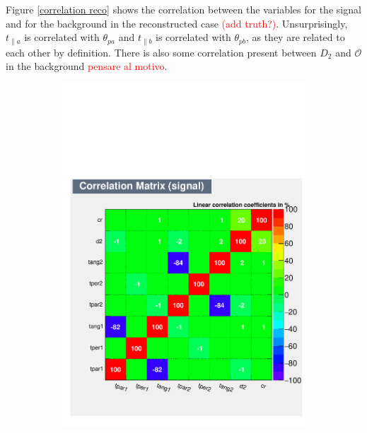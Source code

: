 \documentclass[10pt,a4paper]{book}
\newcommand\todo[1]{\textcolor{red}{#1}}
\begin{document}
Figure \ref{correlation reco} shows the correlation between the variables for the signal and for the background in the reconstructed case \todo{(add truth?)}. Unsurprisingly, $t_{\parallel a}$ is correlated with $\theta_{pa}$ and $t_{\parallel b}$ is correlated with $\theta_{pb}$, as they are related to each other by definition. There is also some correlation present between $D_2$ and $\mathcal{O}$ in the background \todo{pensare al motivo}. 

\begin{figure}[h]
\begin{subfigure}{1.0\textwidth}
\centering
\includegraphics[scale=0.55]{reco/CorrelationMatrixS.pdf}
\caption{}
\end{subfigure}
\begin{subfigure}{1.0\textwidth}
\centering

\end{subfigure}
\end{figure}
\end{document}
